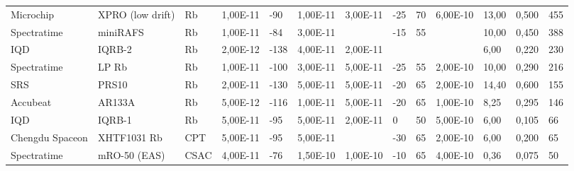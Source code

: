 \begin{table}[H]
{\begin{tabular}{ll|lllllllllll}
            Microchip       & XPRO (low drift) & Rb            & 1,00E-11      & -90                    & 1,00E-11       & 3,00E-11         & -25                    & 70                     & 6,00E-10        & 13,00          & 0,500           & 455                     \\
            Spectratime     & miniRAFS         & Rb            & 1,00E-11      & -84                    & 3,00E-11       & ~                & -15                    & 55                     & ~               & 10,00          & 0,450           & 388                     \\
            IQD             & IQRB-2           & Rb            & 2,00E-12      & -138                   & 4,00E-11       & 2,00E-11         & ~                      & ~                      & ~               & 6,00           & 0,220           & 230                     \\
            Spectratime     & LP Rb            & Rb            & 1,00E-11      & -100                   & 3,00E-11       & 5,00E-11         & -25                    & 55                     & 2,00E-10        & 10,00          & 0,290           & 216                     \\
            SRS             & PRS10            & Rb            & 2,00E-11      & -130                   & 5,00E-11       & 5,00E-11         & -20                    & 65                     & 2,00E-10        & 14,40          & 0,600           & 155                     \\
            Accubeat        & AR133A           & Rb            & 5,00E-12      & -116                   & 1,00E-11       & 5,00E-11         & -20                    & 65                     & 1,00E-10        & 8,25           & 0,295           & 146                     \\
            IQD             & IQRB-1           & Rb            & 5,00E-11      & -95                    & 5,00E-11       & 2,00E-11         & 0                      & 50                     & 5,00E-10        & 6,00           & 0,105           & 66                      \\
            Chengdu Spaceon & XHTF1031 Rb      & CPT           & 5,00E-11      & -95                    & 5,00E-11       & ~                & -30                    & 65                     & 2,00E-10        & 6,00           & 0,200           & 65                      \\
            Spectratime     & mRO-50 (EAS)     & CSAC          & 4,00E-11      & -76                    & 1,50E-10       & 1,00E-10         & -10                    & 65                     & 4,00E-10        & 0,36           & 0,075           & 50                      \\

\end{tabular}}
\end{table}
